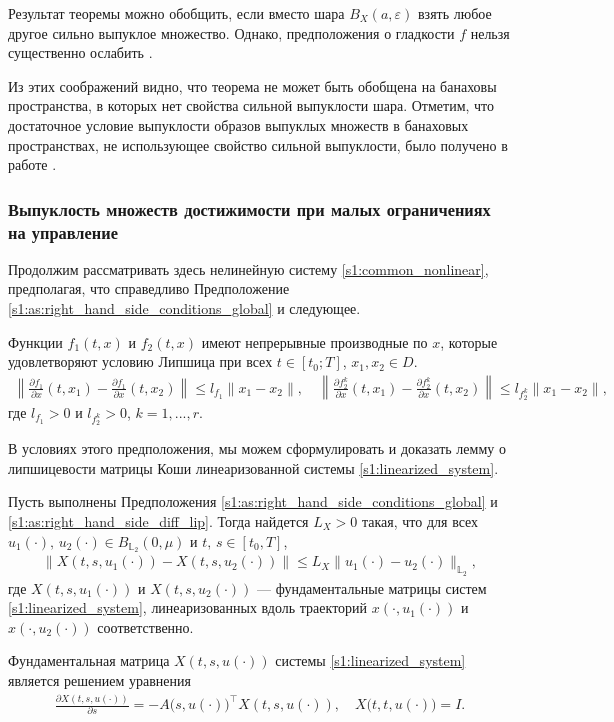\documentclass[../main.tex]{subfiles}
\begin{document}
Результат теоремы можно обобщить, если вместо шара $B_X(a,\varepsilon) $ взять любое другое сильно выпуклое множество.
Однако, предположения о гладкости $f$ нельзя существенно ослабить \cite{Polyak2001, Polyak2001ru}.
 
Из этих соображений видно, что теорема не может быть обобщена на банаховы пространства, в которых нет свойства сильной выпуклости шара.
Отметим, что достаточное условие выпуклости образов выпуклых множеств в банаховых пространствах, не использующее свойство сильной выпуклости, было получено в работе \cite{Ledyaev}. 
 
\subsubsection{Выпуклость множеств достижимости при малых ограничениях на управление}
 
Продолжим рассматривать здесь нелинейную систему \eqref{s1:common_nonlinear}, предполагая, что справедливо Предположение \ref{s1:as:right_hand_side_conditions_global} и следующее.
\begin{assumption}\label{s1:as:right_hand_side_diff_lip}
 Функции $f_1(t,x)$ и $f_2(t,x)$ имеют непрерывные производные по $x$, которые удовлетворяют условию Липшица при всех $t \in [t_0;T]$, $x_1, x_2 \in D$.
 \begin{gather*}
 \left\| \frac{\partial f_1}{\partial x}(t,x_1) - \frac{\partial f_1}{\partial x}(t,x_2) \right\| \leqslant l_{f_1} \| x_1 - x_2\|, \quad \left\| \frac{\partial f_2^k}{\partial x}(t,x_1) - \frac{\partial f_2^k}{\partial x}(t,x_2) \right\| \leqslant l_{f_2^k} \| x_1 - x_2\|,
 \end{gather*}
 где $l_{f_1} > 0$ и $l_{f_2^k} > 0$, $k = 1,...,r$.
\end{assumption}
 
В условиях этого предположения, мы можем сформулировать и доказать лемму о липшицевости матрицы Коши линеаризованной системы \eqref{s1:linearized_system}.
\begin{lemma}\label{s1:lem:lip_fundumental_matrix}
 Пусть выполнены Предположения \ref{s1:as:right_hand_side_conditions_global} и \ref{s1:as:right_hand_side_diff_lip}.
 Тогда найдется $L_X > 0 $ такая, что для всех $u_1(\cdot),\, u_2(\cdot) \in B_{\mathbb{L}_2}(0,\mu)$ и $t, \, s \in [t_0,T]$, 
 \begin{gather*}
 \Big\|X(t,s,u_1(\cdot)) - X(t,s,u_2(\cdot)) \Big\| \leqslant L_X \| u_1(\cdot) - u_2(\cdot) \|_{\mathbb{L}_2},
 \end{gather*}
 где $X(t,s,u_1(\cdot)) $ и $X(t,s,u_2(\cdot)) $ --- фундаментальные матрицы систем \eqref{s1:linearized_system}, линеаризованных вдоль траекторий $x(\cdot, u_1(\cdot)) $ и $x(\cdot, u_2(\cdot)) $ соответственно. 
\end{lemma}
\doc
Фундаментальная матрица $X(t,s,u(\cdot)) $ системы \eqref{s1:linearized_system} является решением уравнения
\begin{gather*}
 \frac{\partial X(t, s, u(\cdot))}{\partial s} = -A\big(s,u(\cdot)\big)^{\top} X(t, s, u(\cdot)), \quad X\big(t, t, u(\cdot)\big) = I.
\end{gather*}
 
\end{document}
